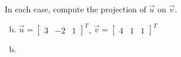 \documentclass[../main.tex]{subfiles}
\begin{document}
In each case, compute the projection of $\vec{u}$ on $\vec{v}$.
\begin{enumerate}[a)]
	\setcounter{enumi}{1}
	\item 
		$\vec{u} = \begin{bmatrix}3&-2&1\end{bmatrix}^T$,
		$\vec{v} = \begin{bmatrix}4&1&1\end{bmatrix}^T$
\end{enumerate}

\solution
\begin{enumerate}[a)]
	\setcounter{enumi}{1}
	\item 
\end{enumerate}
\end{document}
